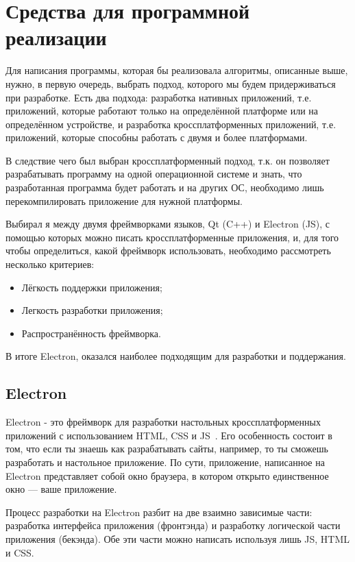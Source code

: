 \section{Средства для программной реализации}

Для написания программы, которая бы  реализовала алгоритмы, описанные выше, нужно, в первую очередь, выбрать подход, которого мы будем придерживаться при разработке. Есть два подхода: разработка нативных приложений, т.е. приложений, которые работают только на определённой платформе или на определённом устройстве, и разработка кроссплатформенных приложений, т.е. приложений, которые способны работать с двумя и более платформами.

В следствие чего был выбран кроссплатформенный подход, т.к. он позволяет разрабатывать программу на одной операционной системе и знать, что разработанная программа будет работать и на других ОС, необходимо лишь перекомпилировать приложение для нужной платформы.

Выбирал я между двумя фреймворками языков, Qt (C++) и Electron (JS), с помощью которых можно писать кроссплатформенные приложения, и, для того чтобы определиться, какой фреймворк использовать, необходимо рассмотреть несколько критериев:

\begin{itemize}
  \item Лёгкость поддержки приложения;
  \item Легкость разработки приложения;
  \item Распространённость фреймворка.
\end{itemize}

В итоге Electron, оказался наиболее подходящим для разработки и поддержания.

\subsection{Electron}

Electron - это фреймворк для разработки настольных кроссплатформенных приложений с использованием HTML, CSS и JS~\cite{electron}. Его особенность состоит в том, что если ты знаешь как разрабатывать сайты, например, то ты сможешь разработать и настольное приложение. По сути, приложение, написанное на Electron представляет собой окно браузера, в котором открыто единственное окно --- ваше приложение.

Процесс разработки на Electron разбит на две взаимно зависимые части: разработка интерфейса приложения (фронтэнда) и разработку логической части приложения (бекэнда). Обе эти части можно написать используя лишь JS, HTML и CSS.

